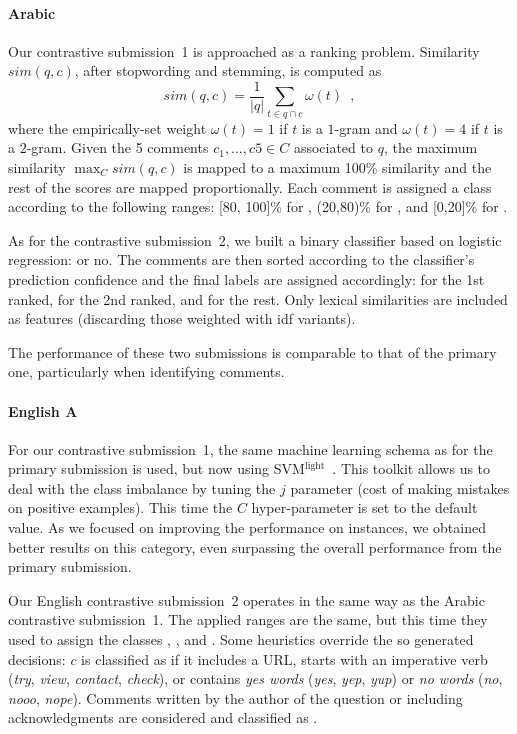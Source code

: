 \paragraph{Arabic} 

Our contrastive submission~1 is approached as a ranking problem. Similarity 
$sim(q,c)$, after stopwording and stemming, is computed as 
\begin{equation}
 sim(q,c) = \frac{1}{|q|} \sum_{t\in q\cap c} \omega(t) \enspace ,
 \label{eq:overlap}
\end{equation}
% 
where the empirically-set weight $\omega(t)=1$ if $t$ is a $1$-gram and 
$\omega(t)=4$ if $t$ is a $2$-gram. Given the 5 comments 
$c_1,\ldots,c5\in C$ associated to $q$, the maximum similarity $\max_C sim(q,c)$ 
is mapped to a maximum 100\% similarity and the rest of the scores are mapped 
proportionally. Each comment is assigned a class according to the following 
ranges: [80, 100]\% for \dir, (20,80)\% for \rel, and [0,20]\% for \irel.


As for the contrastive submission~2, we built a binary classifier based on 
logistic regression: \dir or no. The comments are then sorted according to the 
classifier's prediction confidence and the final labels are assigned 
accordingly: \dir for the 1st ranked, \rel for the 2nd ranked, and \irel for the 
rest. Only lexical similarities are included as features (discarding those 
weighted with idf variants).


The performance of these two submissions is comparable to that of the primary 
one, particularly when identifying \rel comments. 

\paragraph{English A}

For our contrastive submission~1, the same machine learning schema as for the 
primary submission is used, but now using 
SVM$^\mathrm{light}$~\cite{Joachims:99}. This toolkit allows us to deal with 
the class imbalance by tuning the $j$ parameter (cost of making mistakes on 
positive examples). This time the $C$ hyper-parameter is set to the default 
value. As we focused on improving the performance on \pot instances, we obtained 
better results on this category, even surpassing the overall performance from 
the primary submission.

Our English contrastive submission~2 operates in the same way as the Arabic 
contrastive submission~1. The applied ranges are the same, but this time they used to 
assign the classes \good, \pot, and \bad. Some heuristics override the so 
generated decisions: $c$ is classified as \good if it includes a URL, starts 
with an imperative verb (\eg \textit{try}, \textit{view}, \textit{contact}, 
\textit{check}), or contains \textit{yes words} (\eg \textit{yes}, \textit{yep}, 
\textit{yup}) or \textit{no words} (\eg \textit{no}, \textit{nooo}, 
\textit{nope}). Comments written by the author of the question or including 
acknowledgments are considered \dial and classified as \bad. 



